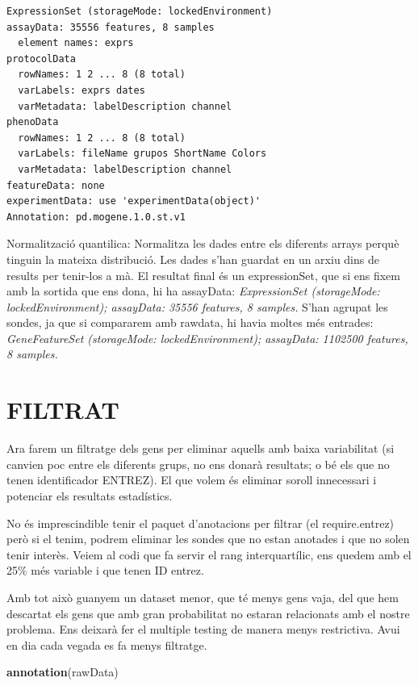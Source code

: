 \documentclass[
]{article}
\newenvironment{Shaded}{\begin{snugshade}}{\end{snugshade}}
\newcommand{\FunctionTok}[1]{\textcolor[rgb]{0.13,0.29,0.53}{\textbf{#1}}}
\newcommand{\NormalTok}[1]{#1}
\begin{document}
\begin{verbatim}
ExpressionSet (storageMode: lockedEnvironment)
assayData: 35556 features, 8 samples 
  element names: exprs 
protocolData
  rowNames: 1 2 ... 8 (8 total)
  varLabels: exprs dates
  varMetadata: labelDescription channel
phenoData
  rowNames: 1 2 ... 8 (8 total)
  varLabels: fileName grupos ShortName Colors
  varMetadata: labelDescription channel
featureData: none
experimentData: use 'experimentData(object)'
Annotation: pd.mogene.1.0.st.v1 
\end{verbatim}

Normalització quantilica: Normalitza les dades entre els diferents
arrays perquè tinguin la mateixa distribució. Les dades s'han guardat en
un arxiu dins de results per tenir-los a mà. El resultat final és un
expressionSet, que si ens fixem amb la sortida que ens dona, hi ha
assayData: \emph{ExpressionSet (storageMode: lockedEnvironment);
assayData: 35556 features, 8 samples.} S'han agrupat les sondes, ja que
si compararem amb rawdata, hi havia moltes més entrades:
\emph{GeneFeatureSet (storageMode: lockedEnvironment); assayData:
1102500 features, 8 samples.}

\section{FILTRAT}\label{filtrat}

Ara farem un filtratge dels gens per eliminar aquells amb baixa
variabilitat (si canvien poc entre els diferents grups, no ens donarà
resultats; o bé els que no tenen identificador ENTREZ). El que volem és
eliminar soroll innecessari i potenciar els resultats estadístics.

No és imprescindible tenir el paquet d'anotacions per filtrar (el
require.entrez) però si el tenim, podrem eliminar les sondes que no
estan anotades i que no solen tenir interès. Veiem al codi que fa servir
el rang interquartílic, ens quedem amb el 25\% més variable i que tenen
ID entrez.

Amb tot això guanyem un dataset menor, que té menys gens vaja, del que
hem descartat els gens que amb gran probabilitat no estaran relacionats
amb el nostre problema. Ens deixarà fer el multiple testing de manera
menys restrictiva. Avui en dia cada vegada es fa menys filtratge.

\begin{Shaded}
\begin{Highlighting}[]
\FunctionTok{annotation}\NormalTok{(rawData)}
\end{Highlighting}
\end{Shaded}
\end{document}
